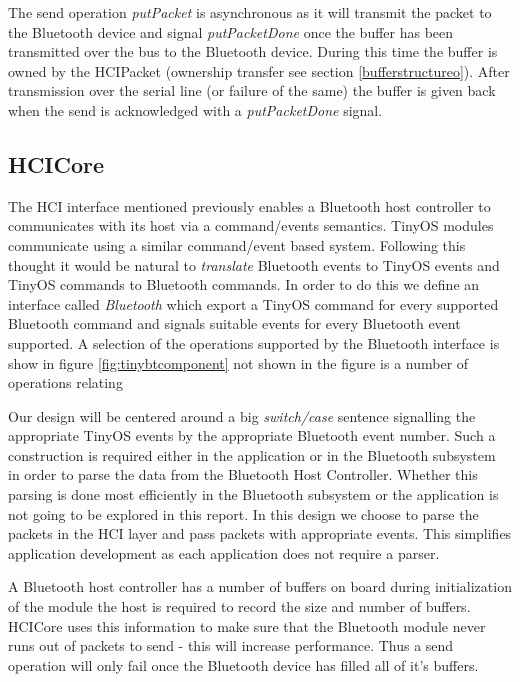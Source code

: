 \documentclass[a4paper,10pt]{article}
\begin{document}
The send operation \emph{putPacket} is asynchronous as it will transmit
the packet to the Bluetooth device and signal \emph{putPacketDone}
once the buffer has been transmitted over the bus to the Bluetooth
device. During this time the buffer is owned by the HCIPacket
(ownership transfer see section \ref{bufferstructureo}). After
transmission over the serial line (or failure of the same) the buffer
is given back when the send is acknowledged with a
\emph{putPacketDone} signal.

\subsection{HCICore}
\label{hcicore}
The HCI interface mentioned previously enables a Bluetooth host
controller to communicates with its host via a command/events
semantics. TinyOS modules communicate using a similar command/event
based system. Following this thought it would be natural to
\emph{translate} Bluetooth events to TinyOS events and TinyOS commands
to Bluetooth commands. In order to do this we define an interface
called \emph{Bluetooth} which export a TinyOS command for every
supported Bluetooth command and signals suitable events for every
Bluetooth event supported. A selection of the operations supported by
the Bluetooth interface is show in figure \ref{fig:tinybtcomponent}
not shown in the figure is a number of operations relating

Our design will be centered around a big \emph{switch/case} sentence
signalling the appropriate TinyOS events by the appropriate Bluetooth
event number. Such a construction is required either in the
application or in the Bluetooth subsystem in order to parse the data
from the Bluetooth Host Controller. Whether this parsing is done most
efficiently in the Bluetooth subsystem or the application is not going
to be explored in this report. In this design we choose to parse the
packets in the HCI layer and pass packets with appropriate events.
This simplifies application development as each application does not
require a parser.

A Bluetooth host controller has a number of buffers on board during
initialization of the module the host is required to record the size
and number of buffers. HCICore uses this information to make sure that
the Bluetooth module never runs out of packets to send - this will
increase performance. Thus a send operation will only fail once the
Bluetooth device has filled all of it's buffers.
\end{document}
